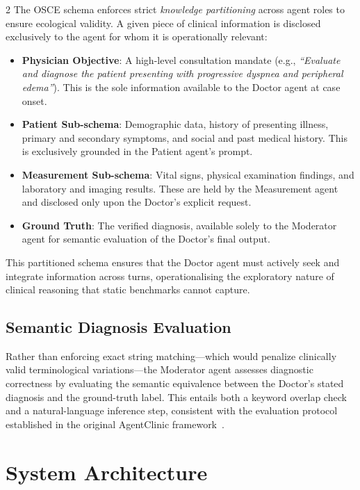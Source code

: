 \documentclass[10pt, a4paper]{article}
\begin{document}
\begin{multicols}{2}
The OSCE schema enforces strict \textit{knowledge partitioning} across agent roles to ensure ecological validity. A given piece of clinical information is disclosed exclusively to the agent for whom it is operationally relevant:

\begin{itemize}[leftmargin=*, itemsep=2pt]
    \item \textbf{Physician Objective}: A high-level consultation mandate (e.g., \textit{``Evaluate and diagnose the patient presenting with progressive dyspnea and peripheral edema''}). This is the sole information available to the Doctor agent at case onset.
    \item \textbf{Patient Sub-schema}: Demographic data, history of presenting illness, primary and secondary symptoms, and social and past medical history. This is exclusively grounded in the Patient agent's prompt.
    \item \textbf{Measurement Sub-schema}: Vital signs, physical examination findings, and laboratory and imaging results. These are held by the Measurement agent and disclosed only upon the Doctor's explicit request.
    \item \textbf{Ground Truth}: The verified diagnosis, available solely to the Moderator agent for semantic evaluation of the Doctor's final output.
\end{itemize}

This partitioned schema ensures that the Doctor agent must actively seek and integrate information across turns, operationalising the exploratory nature of clinical reasoning that static benchmarks cannot capture.

\subsection{Semantic Diagnosis Evaluation}

Rather than enforcing exact string matching—which would penalize clinically valid terminological variations—the Moderator agent assesses diagnostic correctness by evaluating the semantic equivalence between the Doctor's stated diagnosis and the ground-truth label. This entails both a keyword overlap check and a natural-language inference step, consistent with the evaluation protocol established in the original AgentClinic framework~\cite{schmidgall2024agentclinic}.


\section{System Architecture}
\label{sec:methodology}


\end{multicols}
\end{document}
